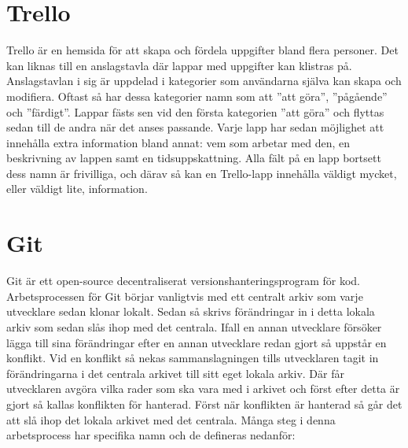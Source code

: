 \section{Trello}
Trello är en hemsida för att skapa och fördela uppgifter bland flera personer.\cite{Trello} Det kan liknas till en anslagstavla där lappar med uppgifter kan klistras på. Anslagstavlan i sig är uppdelad i kategorier som användarna själva kan skapa och modifiera. Oftast så har dessa kategorier namn som att ''att göra'', ''pågående'' och ''färdigt''. Lappar fästs sen vid den första kategorien ''att göra'' och flyttas sedan till de andra när det anses passande. Varje lapp har sedan möjlighet att innehålla extra information bland annat: vem som arbetar med den, en beskrivning av lappen samt en tidsuppskattning. Alla fält på en lapp bortsett dess namn är frivilliga, och därav så kan en Trello-lapp innehålla väldigt mycket, eller väldigt lite, information.

\section{Git}
Git är ett open-source decentraliserat versionshanteringsprogram för kod.\cite{Git} Arbetsprocessen för Git börjar vanligtvis med ett centralt arkiv som varje utvecklare sedan klonar lokalt. Sedan så skrivs förändringar in i detta lokala arkiv som sedan slås ihop med det centrala. Ifall en annan utvecklare försöker lägga till sina förändringar efter en annan utvecklare redan gjort så uppstår en konflikt. Vid en konflikt så nekas sammanslagningen tills utvecklaren tagit in förändringarna i det centrala arkivet till sitt eget lokala arkiv. Där får utvecklaren avgöra vilka rader som ska vara med i arkivet och först efter detta är gjort så kallas konflikten för hanterad. Först när konflikten är hanterad så går det att slå ihop det lokala arkivet med det centrala. Många steg i denna arbetsprocess har specifika namn och de defineras nedanför:

